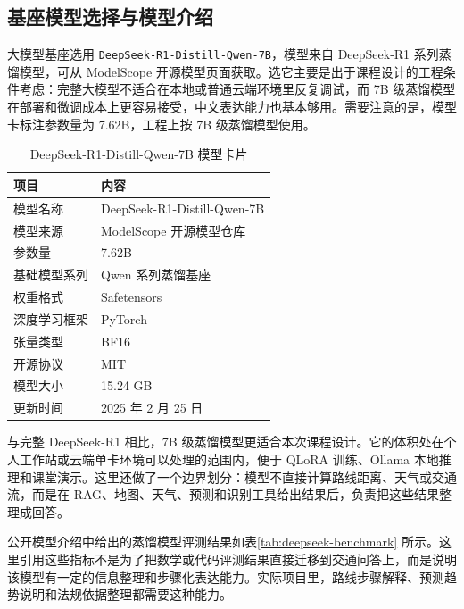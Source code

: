 \documentclass[bwprint]{report}
\begin{document}
\subsection{基座模型选择与模型介绍}
大模型基座选用 \texttt{DeepSeek-R1-Distill-Qwen-7B}，模型来自 DeepSeek-R1 系列蒸馏模型，可从 ModelScope 开源模型页面获取。选它主要是出于课程设计的工程条件考虑：完整大模型不适合在本地或普通云端环境里反复调试，而 7B 级蒸馏模型在部署和微调成本上更容易接受，中文表达能力也基本够用。需要注意的是，模型卡标注参数量为 7.62B，工程上按 7B 级蒸馏模型使用。

\begin{table}[H]
    \caption{DeepSeek-R1-Distill-Qwen-7B 模型卡片}
    \label{tab:deepseek-model-card}
    \centering
    \begin{tabular}{p{}p{}}
        \toprule[1.5pt]
        项目 & 内容 \\
        \midrule[1pt]
        模型名称 & DeepSeek-R1-Distill-Qwen-7B \\
        模型来源 & ModelScope 开源模型仓库 \\
        参数量 & 7.62B \\
        基础模型系列 & Qwen 系列蒸馏基座 \\
        权重格式 & Safetensors \\
        深度学习框架 & PyTorch \\
        张量类型 & BF16 \\
        开源协议 & MIT \\
        模型大小 & 15.24 GB \\
        更新时间 & 2025 年 2 月 25 日 \\
        \bottomrule[1.5pt]
    \end{tabular}
\end{table}

与完整 DeepSeek-R1 相比，7B 级蒸馏模型更适合本次课程设计。它的体积处在个人工作站或云端单卡环境可以处理的范围内，便于 QLoRA 训练、Ollama 本地推理和课堂演示。这里还做了一个边界划分：模型不直接计算路线距离、天气或交通流，而是在 RAG、地图、天气、预测和识别工具给出结果后，负责把这些结果整理成回答。

公开模型介绍中给出的蒸馏模型评测结果如表\ref{tab:deepseek-benchmark} 所示。这里引用这些指标不是为了把数学或代码评测结果直接迁移到交通问答上，而是说明该模型有一定的信息整理和步骤化表达能力。实际项目里，路线步骤解释、预测趋势说明和法规依据整理都需要这种能力。
\end{document}
